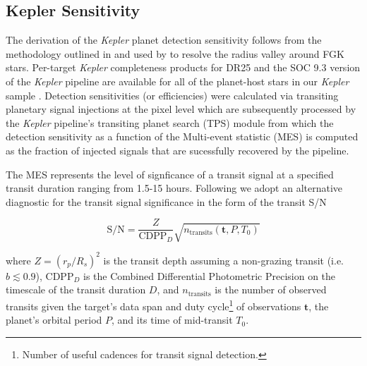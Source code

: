 \documentclass[twocolumn]{emulateapj}
\newcommand{\kepler}[1]{\emph{Kepler}#1}
\begin{document}
\subsection{Kepler Sensitivity}
The derivation of the \kepler{} planet detection sensitivity follows from the methodology outlined in
\cite{christiansen16} and used by \cite{fulton17} to resolve the radius valley around FGK stars. Per-target
\kepler{} completeness products for DR25 and the SOC 9.3 version of the \kepler{} pipeline
\citep{jenkins10} are available
for all of the planet-host stars in our \kepler{} sample \citep{burke15,burke17}. Detection sensitivities
(or efficiencies) were calculated via transiting planetary signal injections at the pixel level
\citep{christiansen15,christiansen17} which are subsequently processed by the \kepler{} pipeline's
transiting planet search (TPS) module from
which the detection sensitivity as a function of the Multi-event statistic (MES) is computed as the fraction of
injected signals that are sucessfully recovered by the pipeline.

The MES represents the level of signficance of a transit signal at a specified transit duration ranging from
1.5-15 hours. Following \cite{petigura18} we adopt an alternative diagnostic for the transit signal significance
in the form of the transit S/N 

\begin{equation}
  \text{S/N} = \frac{Z}{\text{CDPP}_{D}} \sqrt{n_{\text{transits}}(\mathbf{t},P,T_0)}  \label{eq:snr}
\end{equation}

\noindent where $Z=(r_p/R_s)^2$ is the transit depth assuming a non-grazing transit (i.e. $b\lesssim 0.9$),
CDPP$_D$ is the Combined Differential Photometric
Precision on the timescale of the transit duration $D$, and $n_{\text{transits}}$ is the number of
observed transits given the target's data span and duty cycle\footnote{Number of useful cadences for transit signal
detection.} of observations $\textbf{t}$, the planet's orbital period $P$, and its time of mid-transit $T_0$.
\end{document}
